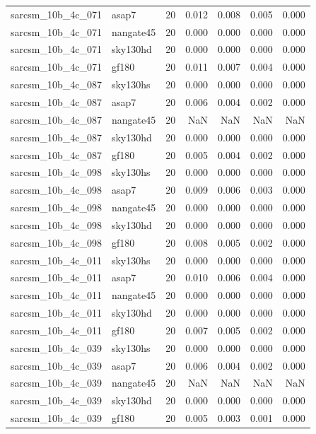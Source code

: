 \begin{tabular}{llrrrrr}
sarcsm\_10b\_4c\_071 & asap7 & 20 & 0.012 & 0.008 & 0.005 & 0.000 \\
sarcsm\_10b\_4c\_071 & nangate45 & 20 & 0.000 & 0.000 & 0.000 & 0.000 \\
sarcsm\_10b\_4c\_071 & sky130hd & 20 & 0.000 & 0.000 & 0.000 & 0.000 \\
sarcsm\_10b\_4c\_071 & gf180 & 20 & 0.011 & 0.007 & 0.004 & 0.000 \\
sarcsm\_10b\_4c\_087 & sky130hs & 20 & 0.000 & 0.000 & 0.000 & 0.000 \\
sarcsm\_10b\_4c\_087 & asap7 & 20 & 0.006 & 0.004 & 0.002 & 0.000 \\
sarcsm\_10b\_4c\_087 & nangate45 & 20 & NaN & NaN & NaN & NaN \\
sarcsm\_10b\_4c\_087 & sky130hd & 20 & 0.000 & 0.000 & 0.000 & 0.000 \\
sarcsm\_10b\_4c\_087 & gf180 & 20 & 0.005 & 0.004 & 0.002 & 0.000 \\
sarcsm\_10b\_4c\_098 & sky130hs & 20 & 0.000 & 0.000 & 0.000 & 0.000 \\
sarcsm\_10b\_4c\_098 & asap7 & 20 & 0.009 & 0.006 & 0.003 & 0.000 \\
sarcsm\_10b\_4c\_098 & nangate45 & 20 & 0.000 & 0.000 & 0.000 & 0.000 \\
sarcsm\_10b\_4c\_098 & sky130hd & 20 & 0.000 & 0.000 & 0.000 & 0.000 \\
sarcsm\_10b\_4c\_098 & gf180 & 20 & 0.008 & 0.005 & 0.002 & 0.000 \\
sarcsm\_10b\_4c\_011 & sky130hs & 20 & 0.000 & 0.000 & 0.000 & 0.000 \\
sarcsm\_10b\_4c\_011 & asap7 & 20 & 0.010 & 0.006 & 0.004 & 0.000 \\
sarcsm\_10b\_4c\_011 & nangate45 & 20 & 0.000 & 0.000 & 0.000 & 0.000 \\
sarcsm\_10b\_4c\_011 & sky130hd & 20 & 0.000 & 0.000 & 0.000 & 0.000 \\
sarcsm\_10b\_4c\_011 & gf180 & 20 & 0.007 & 0.005 & 0.002 & 0.000 \\
sarcsm\_10b\_4c\_039 & sky130hs & 20 & 0.000 & 0.000 & 0.000 & 0.000 \\
sarcsm\_10b\_4c\_039 & asap7 & 20 & 0.006 & 0.004 & 0.002 & 0.000 \\
sarcsm\_10b\_4c\_039 & nangate45 & 20 & NaN & NaN & NaN & NaN \\
sarcsm\_10b\_4c\_039 & sky130hd & 20 & 0.000 & 0.000 & 0.000 & 0.000 \\
sarcsm\_10b\_4c\_039 & gf180 & 20 & 0.005 & 0.003 & 0.001 & 0.000 \\

\end{tabular}

